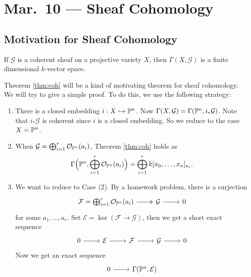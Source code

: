 \chapter{Mar.~10 --- Sheaf Cohomology}

\section{Motivation for Sheaf Cohomology}\label{sec:motivation}
\begin{theorem}\label{thm:coh}
  If $\mathcal{G}$ is a coherent sheaf
  on a projective variety $X$, then
  $\Gamma(X, \mathcal{G})$ is a finite
  dimensional $k$-vector space.
\end{theorem}

\begin{remark}
  Theorem \ref{thm:coh} will be a kind of
  motivating theorem for sheaf cohomology.
  We will try to give a simple proof.
  To do this, we use the following strategy:
  \begin{enumerate}
    \item There is a closed embedding
      $i : X \hookrightarrow \mathbb{P}^n$.
      Now $\Gamma(X, \mathcal{G}) = \Gamma(\mathbb{P}^n, i_*\mathcal{G})$.
      Note that $i_* \mathcal{G}$ is
      coherent since $i$ is a closed
      embedding. So we reduce to the case
      $X = \mathbb{P}^n$.
    \item When $\mathcal{G} = \bigoplus_{i = 1}^r \mathcal{O}_{\mathbb{P}^n}(a_i)$,
      Theorem \ref{thm:coh} holds as
      \[
        \Gamma\Big(\mathbb{P}^n, \bigoplus_{i = 1}^r \mathcal{O}_{\mathbb{P}^n}(a_i)\Big)
        = \bigoplus_{i = 1}^r k[x_0, \dots, x_n]_{a_i}.
      \]
    \item We want to reduce to Case (2).
      By a homework problem, there is a
      surjection
      \[
        \begin{tikzcd}
          \mathcal{F}
          = \bigoplus_{i = 1}^r \OO_{\PP^n}(a_i)
          \ar[r, two heads] & \mathcal{G}
          \ar[r] & 0
        \end{tikzcd}
      \]
      for some $a_1, \dots, a_r$. Set
      $\mathcal{E} = \ker(\mathcal{F} \to \mathcal{G})$, then
      we get a short exact sequence
      \[
        \begin{tikzcd}
          0 \ar[r] & \mathcal{E} \ar[r] & \mathcal{F}
          \ar[r] & \mathcal{G} \ar[r] & 0
        \end{tikzcd}
      \]
      Now we get an exact sequence
      \[
        \begin{tikzcd}
          0 \ar[r] & \Gamma(\PP^n, \mathcal{E})

\end{tikzcd}\]
\end{enumerate}
\end{remark}
